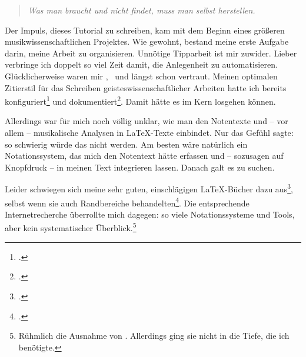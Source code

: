 %
%
%



\begin{quote}\textit{Was man braucht und nicht findet, muss man selbst herstellen.}
\end{quote}

Der Impuls, dieses Tutorial zu schreiben, kam mit dem Beginn eines größeren
musikwissenschaftlichen Projektes. Wie gewohnt, bestand meine erste Aufgabe
darin, meine Arbeit zu organisieren. Unnötige Tipparbeit ist mir zuwider. Lieber
verbringe ich doppelt so viel Zeit damit, die Anlegenheit zu automatisieren.
Glücklicherweise waren mir \acc{\LaTeX}, \ und  längst
schon vertraut. Meinen optimalen Zitierstil für das Schreiben
geisteswissenschaftlicher Arbeiten hatte ich bereits
konfiguriert\footcite[vgl.][\nopage wp.]{Reincke2018a} und
dokumentiert\footcite[vgl][2ff]{Reincke2018b}. Damit hätte es im Kern losgehen
können.

Allerdings war für mich noch völlig unklar, wie man den Notentexte und -- vor
allem -- musikalische Analysen in \LaTeX-Texte einbindet. Nur das Gefühl sagte:
so schwierig würde das nicht werden. Am besten wäre natürlich ein
No\-ta\-tions\-system, das mich den Notentext hätte erfassen und -- sozusagen auf
Knopfdruck -- in meinen Text integrieren lassen. Danach galt es zu suchen.

Leider schwiegen sich meine sehr guten, einschlägigen \LaTeX-Bücher dazu
aus\footcite[vgl.][vi ff, insbesondere 905 u. 909: das umfangreiche Register
erwähnt weder Musik im allgemeinen noch LilyPond oder MusiX\TeX\ im
Besonderen]{Voss2012a}, selbst wenn sie auch Randbereiche
behandelten\footcite[vgl.][vii ff, insbesondere 1080 u.
1087: auch dieses umfangreiche Register erwähnt weder Musik im allgemeinen noch
LilyPond oder MusiX\TeX\ im Besonderen.]{MitGoo2005a}. Die entsprechende
Internetrecherche überrollte mich dagegen: so viele Notationssysteme und Tools,
aber kein systematischer Überblick.\footnote{Rühmlich die Ausnahme von
\cite[][\nopage wp.]{Thoma2018a}. Allerdings ging sie nicht in die Tiefe, die ich
benötigte.}

